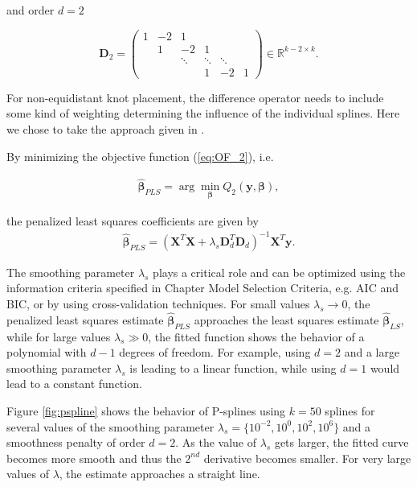 \documentclass[10pt,a4paper]{article}
\begin{document}
	and order $d=2$
	
	$$\boldsymbol{D}_2 = 
			\begin{pmatrix} 
				1& -2& 1& &    \\  
				 & 1 & -2 & 1& \\ 
				 &  & \ddots & \ddots  & \ddots \\ 
				 & & & 1 & -2 & 1 
			\end{pmatrix} \in \mathbb R^{k-2\times k}.$$
	
	For non-equidistant knot placement, the difference operator needs to include some kind of weighting determining the influence of the individual splines. Here we chose to take the approach given in \cite{ferziger2008numerische}.
	
	By minimizing the objective function (\ref{eq:OF_2}), i.e.
	
	\begin{align}\label{eq:optimization_problem_2}
		\boldsymbol{\hat \beta}_{PLS} = \arg \min_{\boldsymbol{\beta}} Q_2(\boldsymbol{y}, \boldsymbol{\beta}),
	\end{align}
	
	the penalized least squares coefficients are given by
	\begin{align} \label{eq:PLS_coef}
		\boldsymbol{\hat \beta}_{PLS}= (\boldsymbol{X}^T \boldsymbol{X} + \lambda_s \boldsymbol{D}_d^T \boldsymbol{D}_d)^{-1} \boldsymbol{X}^T \boldsymbol{y}.
	\end{align} 
	
	The smoothing parameter $\lambda_s$ plays a critical role and can be optimized using the information criteria specified in Chapter Model Selection Criteria, e.g. AIC and BIC, or by using cross-validation techniques. \cite{fahrmeir2013regression}
	For small values $\lambda_s \rightarrow 0$, the penalized least squares estimate $\hat{\boldsymbol{\beta}}_{PLS}$ approaches the least squares estimate $\hat{\boldsymbol{\beta}}_{LS}$, while for large values $\lambda_s \gg 0$, the fitted function shows the behavior of a polynomial with $d-1$ degrees of freedom. For example, using $d=2$ and a large smoothing parameter $\lambda_s$ is leading to a linear function, while using $d=1$ would lead to a constant function. \cite{fahrmeir2013regression}
	
	Figure \ref{fig:pspline} shows the behavior of P-splines using $k=50$ splines for several values of the smoothing parameter $\lambda_s = \{10^{-2}, 10^{0},10^{2},10^{6}\}$ and a smoothness penalty of order $d=2$.  As the value of $\lambda_s$ gets larger, the fitted curve becomes more smooth and thus the $2^{nd}$ derivative becomes smaller. For very large values of $\lambda$, the estimate approaches a straight line.
	
\end{document}
